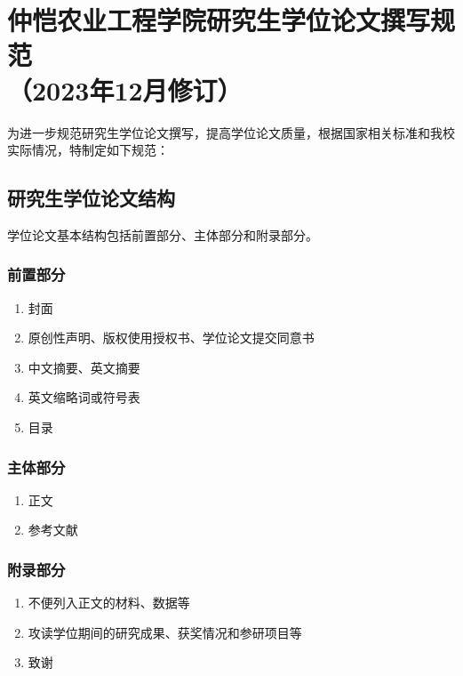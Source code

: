 \chapter[研究生学位论文撰写规范]{仲恺农业工程学院研究生学位论文撰写规范\\（2023年12月修订）}
{
\let\cleardoublepage\relax
}

为进一步规范研究生学位论文撰写，提高学位论文质量，根据国家相关标准和我校实际情况，特制定如下规范：

\section{研究生学位论文结构}

学位论文基本结构包括前置部分、主体部分和附录部分。

\subsection{前置部分}

\begin{enumerate}
    \item 封面
    \item 原创性声明、版权使用授权书、学位论文提交同意书
    \item 中文摘要、英文摘要
    \item 英文缩略词或符号表
    \item 目录
\end{enumerate}

\subsection{主体部分}

\begin{enumerate}
    \item 正文
    \item 参考文献
\end{enumerate}

\subsection{附录部分}

\begin{enumerate}
    \item 不便列入正文的材料、数据等
    \item 攻读学位期间的研究成果、获奖情况和参研项目等
    \item 致谢
\end{enumerate}

